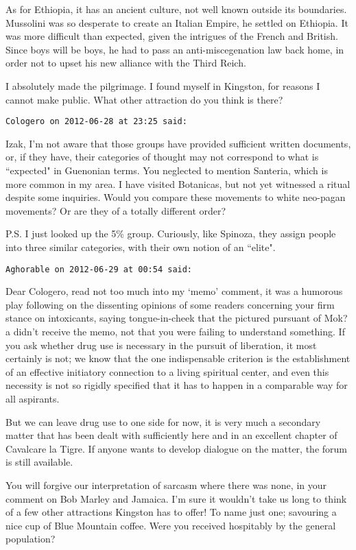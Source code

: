 \begin{footnotesize}
\begin{sffamily}
As for Ethiopia, it has an ancient culture, not well known outside its boundaries. Mussolini was so desperate to create an Italian Empire, he settled on Ethiopia. It was more difficult than expected, given the intrigues of the French and British. Since boys will be boys, he had to pass an anti-miscegenation law back home, in order not to upset his new alliance with the Third Reich.

I absolutely made the pilgrimage. I found myself in Kingston, for reasons I cannot make public. What other attraction do you think is there?


\hfill

\texttt{Cologero on 2012-06-28 at 23:25 said: }

Izak, I'm not aware that those groups have provided sufficient written documents, or, if they have, their categories of thought may not correspond to what is ``expected" in Guenonian terms. You neglected to mention Santeria, which is more common in my area. I have visited Botanicas, but not yet witnessed a ritual despite some inquiries. Would you compare these movements to white neo-pagan movements? Or are they of a totally different order?

P.S. I just looked up the 5\% group. Curiously, like Spinoza, they assign people into three similar categories, with their own notion of an ``elite".


\hfill

\texttt{Aghorable on 2012-06-29 at 00:54 said: }

Dear Cologero, read not too much into my `memo' comment, it was a humorous play following on the dissenting opinions of some readers concerning your firm stance on intoxicants, saying tongue-in-cheek that the pictured pursuant of Mok?a didn't receive the memo, not that you were failing to understand something. If you ask whether drug use is necessary in the pursuit of liberation, it most certainly is not; we know that the one indispensable criterion is the establishment of an effective initiatory connection to a living spiritual center, and even this necessity is not so rigidly specified that it has to happen in a comparable way for all aspirants.

But we can leave drug use to one side for now, it is very much a secondary matter that has been dealt with sufficiently here and in an excellent chapter of Cavalcare la Tigre. If anyone wants to develop dialogue on the matter, the forum is still available.

You will forgive our interpretation of sarcasm where there was none, in your comment on Bob Marley and Jamaica. I'm sure it wouldn't take us long to think of a few other attractions Kingston has to offer! To name just one; savouring a nice cup of Blue Mountain coffee. Were you received hospitably by the general population?



\end{sffamily}
\end{footnotesize}
